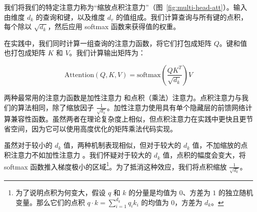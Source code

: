 
我们将我们的特定注意力称为“缩放点积注意力”（图~\ref{fig:multi-head-att}）。输入由维度 $d_k$ 的查询和键，以及维度 $d_v$ 的值组成。我们计算查询与所有键的点积，每个除以 $\sqrt{d_k}$，然后应用 softmax 函数来获得值的权重。

在实践中，我们同时计算一组查询的注意力函数，将它们打包成矩阵 $Q$。键和值也打包成矩阵 $K$ 和 $V$。我们计算输出矩阵为：

\begin{equation}
   \mathrm{Attention}(Q, K, V) = \mathrm{softmax}(\frac{QK^T}{\sqrt{d_k}})V
\end{equation}

两种最常用的注意力函数是加性注意力 \citep{bahdanau2014neural} 和点积（乘法）注意力。点积注意力与我们的算法相同，除了缩放因子 $\frac{1}{\sqrt{d_k}}$。加性注意力使用具有单个隐藏层的前馈网络计算兼容性函数。虽然两者在理论复杂度上相似，但点积注意力在实践中更快且更节省空间，因为它可以使用高度优化的矩阵乘法代码实现。




虽然对于较小的 $d_k$ 值，两种机制表现相似，但对于较大的 $d_k$ 值，不加缩放的点积注意力不如加性注意力 \citep{DBLP:journals/corr/BritzGLL17}。我们怀疑对于较大的 $d_k$ 值，点积的幅度会变大，将 softmax 函数推入梯度极小的区域\footnote{为了说明点积为何变大，假设 $q$ 和 $k$ 的分量是均值为 $0$、方差为 $1$ 的独立随机变量。那么它们的点积 $q \cdot k = \sum_{i=1}^{d_k} q_ik_i$ 的均值为 $0$，方差为 $d_k$。}。为了抵消这种效应，我们将点积缩放 $\frac{1}{\sqrt{d_k}}$。


